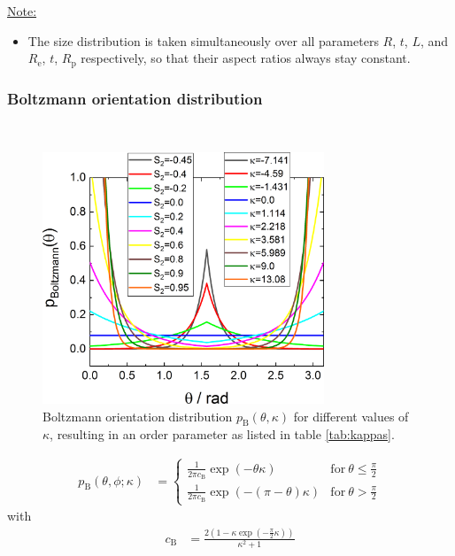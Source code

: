 \vspace{5mm}

\uline{Note:}
\begin{itemize}
\item The size distribution is taken simultaneously over all parameters $R$, $t$, $L$, and $R_\mathrm{e}$, $t$, $R_\mathrm{p}$ respectively, so that their aspect ratios always stay constant.
\end{itemize}

\newpage
\subsubsection{Boltzmann orientation distribution} ~\\

\begin{figure}[htb]
\includegraphics[width=0.75\textwidth]{../images/form_factor/cylindrical_obj/pBoltzmannGr.png}
\caption{Boltzmann orientation distribution $p_\mathrm{B}(\theta,\kappa)$ for different values of $\kappa$, resulting in an order parameter as listed in table \ref{tab:kappas}.}
\label{fig:pBoltzmannGr}
\end{figure}

\begin{align}
p_\mathrm{B}(\theta,\phi;\kappa) & =
\begin{cases}
\displaystyle
\frac{1}{2\pi c_\mathrm{B}}\exp\left(-\theta\kappa\right) & \mathrm{for~}  \theta \leq \frac{\pi}{2}\\[5mm]
\displaystyle
\frac{1}{2\pi c_\mathrm{B}}\exp\left(-(\pi-\theta)\kappa\right) & \mathrm{for~}  \theta > \frac{\pi}{2}
\end{cases}
\end{align}
with
\begin{align}
c_\mathrm{B} &= \frac{2\left(1-\kappa \exp\left(-\frac{\pi}{2}\kappa\right)\right)}{\kappa^2+1}
\end{align}

